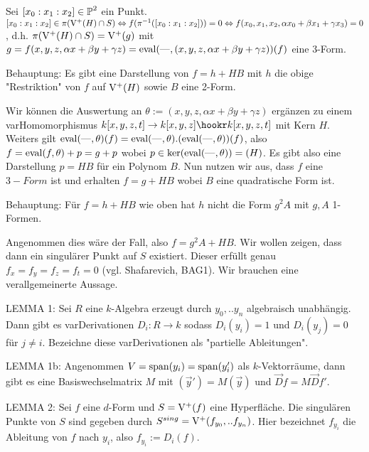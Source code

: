 Sei $[x_0:x_1:x_2] \in \operatorname{\mathbb P}^2$ ein Punkt.
$[x_0:x_1:x_2] \in \pi(\operatorname{V^+}(H)\cap S)
\Leftrightarrow f(\pi^{-1}([x_0:x_1:x_2])) = 0
\Leftrightarrow f(x_0,x_1,x_2,\alpha x_0 + \beta x_1 + \gamma x_3) = 0$, d.h. $\pi(\operatorname{V^+}(H)\cap S) = \operatorname{V^+}(g)$ mit $g=f(x, y, z, \alpha x + \beta y + \gamma z) = {\operatorname{eval}}({\operatorname{---}},(x, y, z, \alpha x + \beta y + \gamma z))(f)$ eine 3-Form.

{\LARGE %
Behauptung: Es gibt eine Darstellung von $f = h + HB$ mit $h$ die obige "Restriktion" von $f$ auf $\operatorname{V^+}(H)$ sowie $B$ eine 2-Form.
} %


Wir können die Auswertung an $\theta := (x,y,z,\alpha x + \beta y + \gamma z)$ ergänzen zu einem var{Hom}omorphismus $k[x,y,z,t] \to k[x,y,z] \hookr k[x,y,z,t]$ mit Kern $H$. Weiters gilt ${\operatorname{eval}}({\operatorname{---}},\theta)(f) = {\operatorname{eval}}({\operatorname{---}},\theta).({\operatorname{eval}}({\operatorname{---}},\theta))(f)$, also $f = {\operatorname{eval}}(f,\theta) + p = g+p$ wobei $p \in \ker({\operatorname{eval}}({\operatorname{---}},\theta)) = (H)$.
Es gibt also eine Darstellung $p = HB$ für ein Polynom $B$.
Nun nutzen wir aus, dass $f$ eine $3-Form$ ist und erhalten $f = g+HB$ wobei $B$ eine quadratische Form ist.

{\LARGE %
Behauptung: Für $f = h + HB$ wie oben hat $h$ nicht die Form $g^2A$ mit $g,A$ 1-Formen.
} %

Angenommen dies wäre der Fall, also $f = g^2A+HB$.
Wir wollen zeigen, dass dann ein singulärer Punkt auf $S$ existiert.
Dieser erfüllt genau $f_x = f_y = f_z = f_t = 0$ (vgl. Shafarevich, BAG1).
Wir brauchen eine verallgemeinerte Aussage.



{\LARGE %
LEMMA 1: Sei $R$ eine $k$-Algebra erzeugt durch $y_0,..y_n$ algebraisch unabhängig.
Dann gibt es var{Der}ivationen $D_i : R \to k$ sodass $D_i(y_i) = 1$ und $D_i(y_j) = 0$ für $j\neq i$. Bezeichne diese var{Der}ivationen als "partielle Ableitungen".

LEMMA 1b: Angenommen $V = {\operatorname{span}}(y_i) = {\operatorname{span}}(y'_i)$ als $k$-Vektorräume, dann gibt es eine Basiswechselmatrix $M$ mit $(\vec y') = M(\vec y)$ und $\vec Df = M \vec Df'$.

LEMMA 2:
Sei $f$ eine $d$-Form und $S = \operatorname{V^+}(f)$ eine Hyperfläche. Die singulären Punkte von $S$ sind gegeben durch $S^{sing} = \operatorname{V^+}(f_{y_0},..f_{y_n})$. Hier bezeichnet $f_{y_i}$ die Ableitung von $f$ nach $y_i$, also $f_{y_i} := D_i(f)$.
} %

